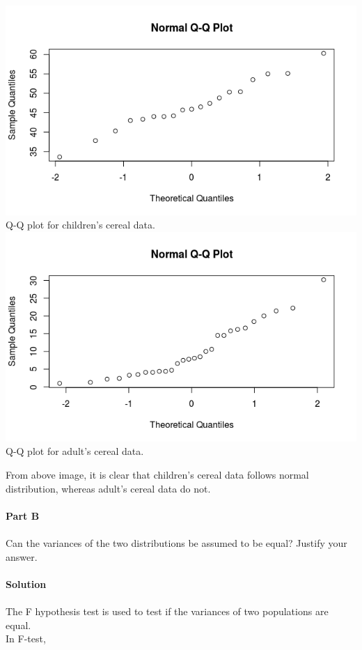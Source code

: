 \documentclass[12pt,a4paper]{report}
\begin{document}
\begin{center}
\includegraphics[scale=0.5]{children.png}\\
Q-Q plot for children's cereal data.\\
\includegraphics[scale=0.5]{adult.png}\\
Q-Q plot for adult's cereal data.\\
\end{center}
\vspace{0.5 in}
From above image, it is clear that children's cereal data follows normal distribution, whereas adult's cereal data do not.
\\\\
\textbf{Part B}
\\\\
Can the variances of the two distributions be assumed to be equal? Justify your answer.
\\\\
\textbf{Solution}
\\\\
The F hypothesis test is used to test if the variances of two populations are equal. \\In F-test,\\
\end{document}
